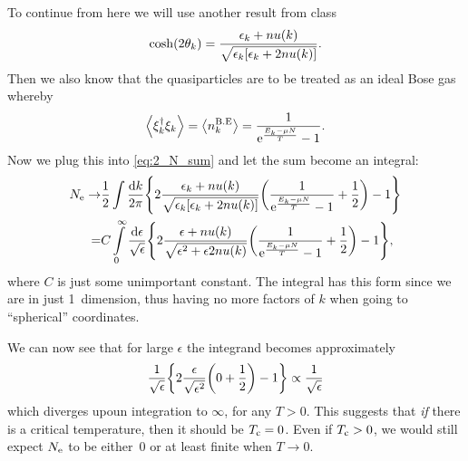 \documentclass[11pt,letter, swedish, english
]{article}
\begin{document}
To continue from here we will use another result from class
\begin{equation}
\cosh(2\theta_k)=\frac{\epsilon_k+nu(k)}
{\sqrt{\epsilon_k\qty[\epsilon_k+2nu(k)]}}.
\end{equation}
Then we also know that the quasiparticles are to be treated as an
ideal Bose gas whereby
\begin{equation}
\ev{\xi^\dagger_k\xi_k
}=\ev{n_k^{\text{B.E}}}=\frac{1}{\ee^{\frac{E_k-\mu N}{T}}-1}.
\end{equation}
Now we plug this into \eqref{eq:2_N_sum} and let the sum become an
integral:
\begin{equation}
\begin{aligned}
\Ne\to&
\frac{1}{2}\int \frac{\dd{k}}{2\pi}\qty{
2\frac{\epsilon_k+nu(k)}{\sqrt{\epsilon_k\qty[\epsilon_k+2nu(k)]}}
\qty(\frac{1}{\ee^{\frac{E_k-\mu N}{T}}-1}+\frac{1}{2})-1
}\\
=&C\int_0^\infty\frac{\rd\epsilon}{\sqrt{\epsilon}}\qty{
2\frac{\epsilon+nu(k)}{\sqrt{\epsilon^2+\epsilon2nu(k)}}
\qty(\frac{1}{\ee^{\frac{E_k-\mu N}{T}}-1}+\frac{1}{2})-1
},
\end{aligned}
\end{equation}
where $C$ is just some unimportant constant. The integral has this
form since we are in just 1~dimension, thus having no more factors of
$k$ when going to ``spherical'' coordinates.

We can now see that for large $\epsilon$ the integrand becomes approximately
\begin{equation}
\frac{1}{\sqrt{\epsilon}}\qty{
2\frac{\epsilon}{\sqrt{\epsilon^2}}
\qty(0+\frac{1}{2})-1}
\propto\frac{1}{\sqrt{\epsilon}}
\end{equation}
which diverges upoun integration to $\infty$, for any $T>0$. This suggests that
\emph{if} there is a critical temperature, then it should be
$T_{\text{c}}=0$. Even if $T_{\text{c}}>0$, we would still expect $N_{\text{e}}$ to be either~0
or at least finite when $T\to0$.
\end{document}

